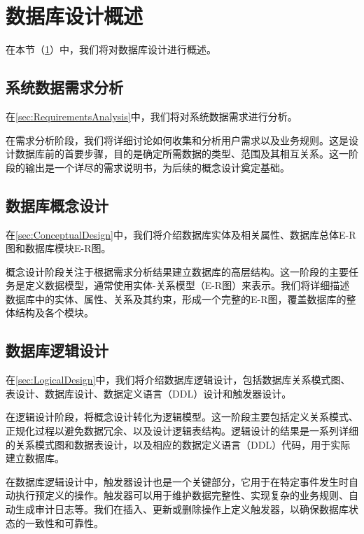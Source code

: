\section{数据库设计概述}\label{sec:Overview}

在本节（\cref{sec:Overview}）中，我们将对数据库设计进行概述。

\subsection{系统数据需求分析}

在\cref{sec:RequirementsAnalysis}中，我们将对系统数据需求进行分析。

在需求分析阶段，我们将详细讨论如何收集和分析用户需求以及业务规则。这是设计数据库前的首要步骤，目的是确定所需数据的类型、范围及其相互关系。这一阶段的输出是一个详尽的需求说明书，为后续的概念设计奠定基础。

\subsection{数据库概念设计}

在\cref{sec:ConceptualDesign}中，我们将介绍数据库实体及相关属性、数据库总体E-R图和数据库模块E-R图。

概念设计阶段关注于根据需求分析结果建立数据库的高层结构。这一阶段的主要任务是定义数据模型，通常使用实体-关系模型（E-R图）来表示。我们将详细描述数据库中的实体、属性、关系及其约束，形成一个完整的E-R图，覆盖数据库的整体结构及各个模块。

\subsection{数据库逻辑设计}

在\cref{sec:LogicalDesign}中，我们将介绍数据库逻辑设计，包括数据库关系模式图、表设计、数据库设计、数据定义语言（DDL）设计和触发器设计。

在逻辑设计阶段，将概念设计转化为逻辑模型。这一阶段主要包括定义关系模式、正规化过程以避免数据冗余、以及设计逻辑表结构。逻辑设计的结果是一系列详细的关系模式图和数据表设计，以及相应的数据定义语言（DDL）代码，用于实际建立数据库。

在数据库逻辑设计中，触发器设计也是一个关键部分，它用于在特定事件发生时自动执行预定义的操作。触发器可以用于维护数据完整性、实现复杂的业务规则、自动生成审计日志等。我们在插入、更新或删除操作上定义触发器，以确保数据库状态的一致性和可靠性。